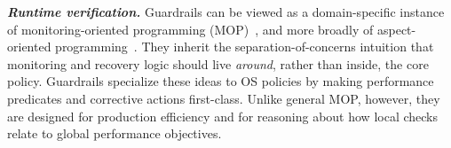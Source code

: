 \noindent
{\bf {\em Runtime verification.}}
Guardrails can be viewed as a domain-specific instance of monitoring-oriented programming (MOP)~\cite{mop-oopsla07}, and more broadly of aspect-oriented programming~\cite{kiczales1997aspect}. They inherit the separation-of-concerns intuition that monitoring and recovery logic should live \emph{around}, rather than inside, the core policy. Guardrails specialize these ideas to OS policies by making performance predicates and corrective actions first-class. Unlike general MOP, however, they are designed for production efficiency and for reasoning about how local checks relate to global performance objectives.
